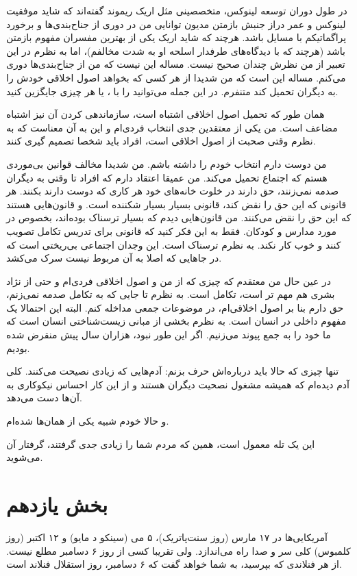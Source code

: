 در طول دوران توسعه لینوکس، متخصصینی مثل اریک ریموند گفته‌اند که شاید موفقیت لینوکس
و عمر دراز جنبش بازمتن مدیون توانایی من در دوری از جناح‌بندی‌ها و برخورد
پراگماتیکم با مسایل باشد. هرچند که شاید اریک یکی از بهترین مفسران
مفهوم بازمتن باشد (هرچند که با دیدگاه‌های طرفدار اسلحه او به شدت
مخالفم)، اما به نظرم در این تعبیر از من نظرش چندان صحیح نیست. مساله
این نیست که من از جناح‌بندی‌ها دوری می‌کنم. مساله این است که من شدیدا از
هر کسی که بخواهد اصول اخلاقی خودش را به دیگران تحمیل کند متنفرم. در
این جمله می‌توانید  را با ،
 یا هر چیزی جایگزین کنید.

همان طور که تحمیل اصول اخلاقی اشتباه است، سازماندهی کردن آن نیز اشتباه
مضاعف است. من یکی از معتقدین جدی انتخاب فردی‌ام و این به آن معناست که
به نظرم وقتی صحبت از اصول اخلاقی است، افراد باید شخصا تصمیم گیری کنند.

من دوست دارم انتخاب خودم را داشته باشم. من شدیدا مخالف قوانین بی‌موردی
هستم که اجتماع تحمیل می‌کند. من عمیقا اعتقاد دارم که افراد تا وقتی به
دیگران صدمه نمی‌زنند، حق دارند در خلوت خانه‌های خود هر کاری که دوست
دارند بکنند. هر قانونی که این حق را نقض کند، قانونی بسیار بسیار شکننده
است. و قانون‌هایی هستند که این حق را نقض می‌کنند. من قانون‌هایی دیدم که
بسیار ترسناک بوده‌اند، بخصوص در مورد مدارس و کودکان. فقط به این فکر
کنید که قانونی برای تدریس تکامل تصویب کنند و خوب کار نکند. به نظرم
ترسناک است. این وجدان اجتماعی بی‌ریختی است که در جاهایی که اصلا به آن
مربوط نیست سرک می‌کشد.

در عین حال من معتقدم که چیزی که از من و اصول اخلاقی فردی‌ام و حتی از
نژاد بشری هم مهم تر است، تکامل است. به نظرم تا جایی که به تکامل صدمه
نمی‌زنم، حق دارم بنا بر اصول اخلاقی‌ام، در موضوعات جمعی مداخله
کنم. البته این احتمالا یک مفهوم داخلی در انسان
است. به نظرم بخشی از مبانی زیست‌شناختی انسان است که ما خود را به جمع
پیوند می‌زنیم. اگر این طور نبود، هزاران سال پیش منقرض شده بودیم.

تنها چیزی که حالا باید درباره‌اش حرف بزنم: آدم‌هایی که زیادی نصیحت
می‌کنند. کلی آدم دیده‌ام که همیشه مشغول نصحیت دیگران هستند و از این کار
احساس نیکوکاری به آن‌ها دست می‌دهد.

و حالا خودم شبیه یکی از همان‌ها شده‌ام.

این یک تله معمول است، همین که مردم شما را زیادی جدی گرفتند، گرفتار آن
می‌شوید.

\section{بخش یازدهم}
آمریکایی‌ها در ۱۷ مارس (روز سنت‌پاتریک)، ۵ می (سینکو د مایو) و ۱۲ اکتبر
(روز کلمبوس) کلی سر و صدا راه می‌اندازد. ولی تقریبا کسی از روز ۶ دسامبر
مطلع نیست. از هر فنلاندی که بپرسید، به شما خواهد گفت که ۶ دسامبر، روز
استقلال فنلاند است.

